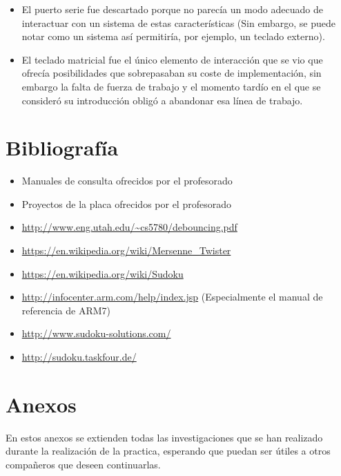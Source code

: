 \documentclass[12pt,letterpaper]{article}
\begin{document}
\begin{itemize}
\begin{itemize}

    \item El puerto serie fue descartado porque no parecía un modo
      adecuado de interactuar con un sistema de estas características
      (Sin embargo, se puede notar como un sistema así permitiría, por
      ejemplo, un teclado externo).
    \item El teclado matricial fue el único elemento de interacción
      que se vio que ofrecía posibilidades que sobrepasaban su coste
      de implementación, sin embargo la falta de fuerza de trabajo y
      el momento tardío en el que se consideró su introducción obligó
      a abandonar esa línea de trabajo.
    \end{itemize}
\end{itemize}
\clearpage
\section{Bibliografía}
\begin{itemize}
  \item Manuales de consulta ofrecidos por el profesorado
  \item Proyectos de la placa ofrecidos por el profesorado
  \item \url{http://www.eng.utah.edu/~cs5780/debouncing.pdf}
  \item \url{https://en.wikipedia.org/wiki/Mersenne_Twister}
  \item \url{https://en.wikipedia.org/wiki/Sudoku}
  \item \url{http://infocenter.arm.com/help/index.jsp} (Especialmente
    el manual de referencia de ARM7)
  \item \url{http://www.sudoku-solutions.com/}
  \item \url{http://sudoku.taskfour.de/}
\end{itemize}

\section{Anexos}
\label{sec:anexos}
En estos anexos se extienden todas las investigaciones que se han
realizado durante la realización de la practica, esperando que puedan
ser útiles a otros compañeros que deseen continuarlas.
\end{document}

